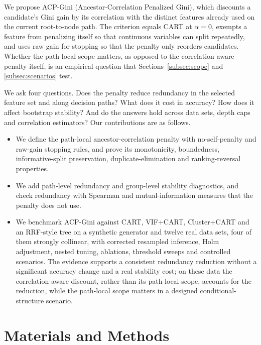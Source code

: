 \documentclass[pdflatex,sn-basic,Numbered]{sn-jnl}
\begin{document}
We propose ACP-Gini (Ancestor-Correlation Penalized Gini), which discounts a candidate's Gini gain by its correlation with the distinct features already used on the current root-to-node path. The criterion equals CART \cite{breiman1984cart} at $\alpha=0$, exempts a feature from penalizing itself so that continuous variables can split repeatedly, and uses raw gain for stopping so that the penalty only reorders candidates. Whether the path-local scope matters, as opposed to the correlation-aware penalty itself, is an empirical question that Sections~\ref{subsec:scope} and \ref{subsec:scenarios} test.

We ask four questions. Does the penalty reduce redundancy in the selected feature set and along decision paths? What does it cost in accuracy? How does it affect bootstrap stability? And do the answers hold across data sets, depth caps and correlation estimators? Our contributions are as follows.
\begin{itemize}
\item We define the path-local ancestor-correlation penalty with no-self-penalty and raw-gain stopping rules, and prove its monotonicity, boundedness, informative-split preservation, duplicate-elimination and ranking-reversal properties.
\item We add path-level redundancy and group-level stability diagnostics, and check redundancy with Spearman and mutual-information measures that the penalty does not use.
\item We benchmark ACP-Gini against CART, VIF+CART, Cluster+CART and an RRF-style tree on a synthetic generator and twelve real data sets, four of them strongly collinear, with corrected resampled inference, Holm adjustment, nested tuning, ablations, threshold sweeps and controlled scenarios. The evidence supports a consistent redundancy reduction without a significant accuracy change and a real stability cost; on these data the correlation-aware discount, rather than its path-local scope, accounts for the reduction, while the path-local scope matters in a designed conditional-structure scenario.
\end{itemize}
\section{Materials and Methods}
\end{document}
